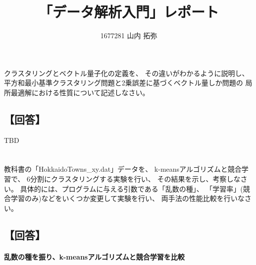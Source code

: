 \documentclass[a4j]{jarticle}
\title{「データ解析入門」レポート}
\author{1677281 山内 拓弥}
\begin{document}
\maketitle

\section{}
クラスタリングとベクトル量子化の定義を、
その違いがわかるように説明し、
平方和最小基準クラスタリング問題と2乗誤差に基づくベクトル量しか問題の
局所最適解における性質について記述しなさい。

\subsection{【回答】}
TBD

\section{}
教科書の「HokkaidoTowns\_xy\@.dat」データを、 k-meansアルゴリズムと競合学習で、
6分割にクラスタリングする実験を行い、 その結果を示し、考察しなさい。
具体的には、プログラムに与える引数である「乱数の種」、
「学習率」(競合学習のみ)などをいくつか変更して実験を行い、
両手法の性能比較を行いなさい。

\subsection{【回答】}

\paragraph{乱数の種を振り、k-meansアルゴリズムと競合学習を比較}
\end{document}
